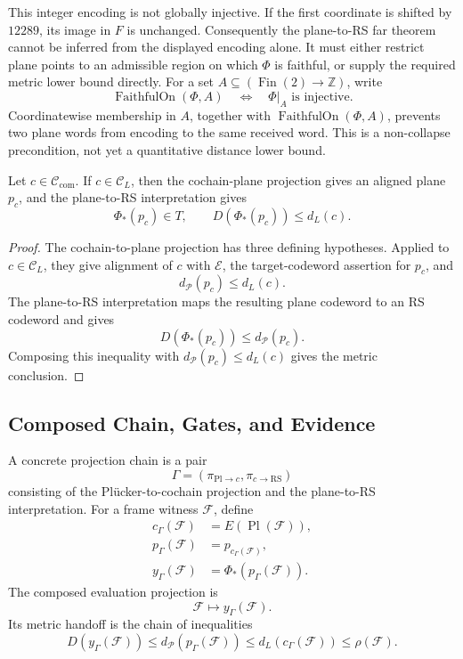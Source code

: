 This integer encoding is not globally injective.  If the first coordinate is
shifted by \(12289\), its image in \(F\) is unchanged.  Consequently the
plane-to-RS far theorem cannot be inferred from the displayed encoding alone.
It must either restrict plane points to an admissible region on which \(\Phi\)
is faithful, or supply the required metric lower bound directly.  For a set
\(A\subseteq(\operatorname{Fin}(2)\to\mathbb Z)\), write
\[
  \operatorname{FaithfulOn}(\Phi,A)
  \quad\Longleftrightarrow\quad
  \Phi|_A\text{ is injective}.
\]
Coordinatewise membership in \(A\), together with
\(\operatorname{FaithfulOn}(\Phi,A)\), prevents two plane words from encoding
to the same received word.  This is a non-collapse precondition, not yet a
quantitative distance lower bound.

\begin{proposition}\label{prop:plane-rs-handoff}
Let \(c\in\mathcal C_{\mathrm{com}}\). If \(c\in\mathcal C_L\), then
the cochain-plane projection gives an aligned plane \(p_c\), and the
plane-to-RS interpretation gives
\[
  \Phi_\ast(p_c)\in T,
  \qquad
  D(\Phi_\ast(p_c))\le d_L(c).
\]
\end{proposition}

\begin{proof}
The cochain-to-plane projection has three defining hypotheses. Applied to
\(c\in\mathcal C_L\), they give alignment of \(c\) with
\(\mathcal E\), the target-codeword assertion for \(p_c\), and
\[
  d_{\mathcal P}(p_c)\le d_L(c).
\]
The plane-to-RS interpretation maps the resulting plane codeword to an RS
codeword and gives
\[
  D(\Phi_\ast(p_c))\le d_{\mathcal P}(p_c).
\]
Composing this inequality with
\(d_{\mathcal P}(p_c)\le d_L(c)\) gives the metric conclusion.
\end{proof}

\subsection{Composed Chain, Gates, and Evidence}

A concrete projection chain is a pair
\[
  \Gamma=(\pi_{\mathrm{Pl}\to c},\pi_{c\to \mathrm{RS}})
\]
consisting of the Pl\"ucker-to-cochain projection and the plane-to-RS
interpretation. For a frame witness \(\mathcal F\), define
\[
\begin{aligned}
  c_\Gamma(\mathcal F)
    &=E(\operatorname{Pl}(\mathcal F)),\\
  p_\Gamma(\mathcal F)
    &=p_{c_\Gamma(\mathcal F)},\\
  y_\Gamma(\mathcal F)
    &=\Phi_\ast(p_\Gamma(\mathcal F)).
\end{aligned}
\]
The composed evaluation projection is
\[
  \mathcal F\longmapsto y_\Gamma(\mathcal F).
\]
Its metric handoff is the chain of inequalities
\[
  D(y_\Gamma(\mathcal F))
  \le d_{\mathcal P}(p_\Gamma(\mathcal F))
  \le d_L(c_\Gamma(\mathcal F))
  \le \rho(\mathcal F).
\]

